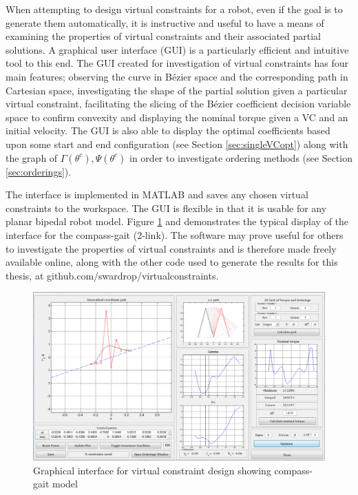 When attempting to design virtual constraints for a robot, even if the goal is to generate them automatically, it is instructive and useful to have a means of examining the properties of virtual constraints and their associated partial solutions. A graphical user interface (GUI) is a particularly efficient and intuitive tool to this end. The GUI created for investigation of virtual constraints has four main features; observing the curve in Bézier space and the corresponding path in Cartesian space, investigating the shape of the partial solution given a particular virtual constraint, facilitating the slicing of the Bézier coefficient decision variable space to confirm convexity and displaying the nominal torque given a VC and an initial velocity. The GUI is also able to display the optimal coefficients based upon some start and end configuration (see Section \ref{sec:singleVCopt}) along with the graph of $\Gamma(\theta^c), \Psi(\theta^c)$ in order to investigate ordering methods (see Section \ref{sec:orderings}).

The interface is implemented in MATLAB and saves any chosen virtual constraints to the workspace. The GUI is flexible in that it is usable for any planar bipedal robot model. Figure \ref{fig:guiCG} and  demonstrates the typical display of the interface for the compass-gait (2-link). The software may prove useful for others to investigate the properties of virtual constraints and is therefore made freely available online, along with the other code used to generate the results for this thesis, at github.com/swardrop/virtualconstraints.

\begin{figure}
	\centering
	\includegraphics[width=0.9\linewidth]{4VirtConstLib/guiVC.png}
	\caption{Graphical interface for virtual constraint design showing compass-gait model}
	\label{fig:guiCG}
\end{figure}
